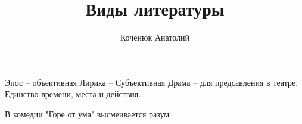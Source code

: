 \documentclass[12pt,a4paper]{article}
\author{Коченюк Анатолий}
\title{Виды литературы}
\begin{document}
 Эпос -- объективная
 Лирика -- Субъективная
 Драма -- для предсавления в театре. Единство времени, места и действия.
 
 В комедии "Горе от ума" высмеивается разум
 
\end{document}
